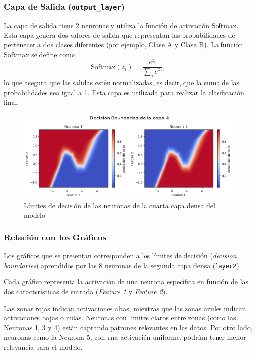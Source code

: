 \documentclass[paper=a4, fontsize=11pt]{scrartcl} %
\numberwithin{equation}{section} %
\numberwithin{figure}{section} %
\numberwithin{table}{section} %
\begin{document}
\subsubsection{Capa de Salida (\texttt{output\_layer})}
La capa de salida tiene 2 neuronas y utiliza la función de activación Softmax. Esta capa genera dos valores de salida que representan las probabilidades de pertenecer a dos clases diferentes (por ejemplo, Clase A y Clase B). La función Softmax se define como
\[
\text{Softmax}(z_i) = \frac{e^{z_i}}{\sum_{j} e^{z_j}},
\]
lo que asegura que las salidas estén normalizadas, es decir, que la suma de las probabilidades sea igual a 1. Esta capa es utilizada para realizar la clasificación final.


\begin{figure}[H]
  \centering
  \includegraphics[width=1\linewidth]{images/plot_neuronas_L4.png}
  \caption{Límites de decisión de las neuronas de la cuarta capa densa del modelo}
  \label{fig:sub1}
\end{figure}

\subsubsection{Relación con los Gráficos}
Los gráficos que se presentan corresponden a los límites de decisión (\textit{decision boundaries}) aprendidos por las 8 neuronas de la segunda capa densa (\texttt{layer2}).

Cada gráfico representa la activación de una neurona específica en función de las dos características de entrada (\textit{Feature 1} y \textit{Feature 2}). 

Las zonas rojas indican activaciones altas, mientras que las zonas azules indican activaciones bajas o nulas. Neuronas con límites claros entre zonas (como las Neuronas 1, 3 y 4) están captando patrones relevantes en los datos. Por otro lado, neuronas como la Neurona 5, con una activación uniforme, podrían tener menor relevancia para el modelo.
\end{document}
